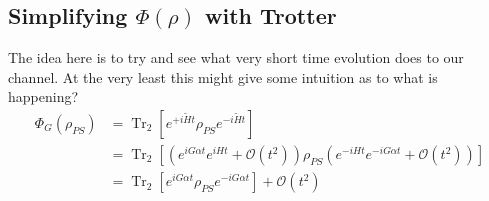 \documentclass{article}
\newcommand{\parens}[1]{\left( #1 \right)}
\newcommand{\brackets}[1]{\left[ #1 \right]}
\newcommand{\bigo}[1]{\mathcal{O}\left( #1 \right)}
\DeclareMathOperator{\Tr}{Tr}
\newcommand{\partrace}[2]{\Tr_{#1} \brackets{ #2 }}
\begin{document}
\subsection{Simplifying $\Phi(\rho)$ with Trotter}
The idea here is to try and see what very short time evolution does to our channel. At the very least this might give some intuition as to what is happening?
\begin{align}
    \Phi_G(\rho_{PS}) &= \partrace{2}{e^{+i\widetilde{H}t} \rho_{PS} e^{-i \widetilde{H} t}} \\
    &= \partrace{2}{\parens{e^{i G \alpha t} e^{i H t} + \bigo{t^2}} \rho_{PS} \parens{e^{-iHt} e^{-i G \alpha t} + \bigo{t^2}}} \\
    &= \partrace{2}{e^{i G \alpha t} \rho_{PS} e^{-i G \alpha t}} + \bigo{t^2} 
\end{align}




\end{document}
